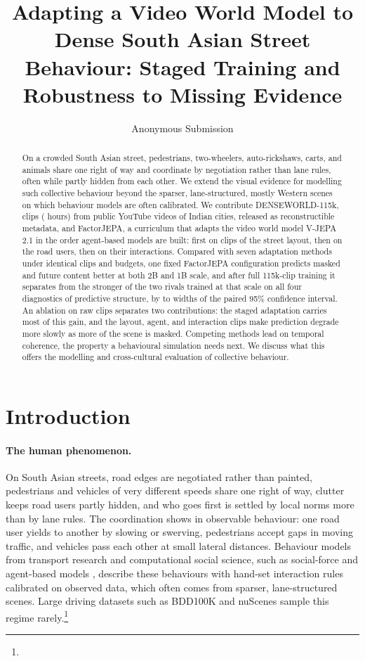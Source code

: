 \documentclass[letterpaper]{article} %
\title{Adapting a Video World Model to Dense South Asian Street Behaviour: Staged Training and Robustness to Missing Evidence}  %
\author{Anonymous Submission}
\begin{document}
\maketitle

\begin{abstract}
On a crowded South Asian street, pedestrians, two-wheelers, auto-rickshaws, carts, and animals share one right of way and coordinate by negotiation rather than lane rules, often while partly hidden from each other. We extend the visual evidence for modelling such collective behaviour beyond the sparser, lane-structured, mostly Western scenes on which behaviour models are often calibrated. We contribute DENSEWORLD-115k, \nClips{} clips (\nHours{} hours) from \nVideos{} public YouTube videos of \nCities{} Indian cities, released as reconstructible metadata, and FactorJEPA, a curriculum that adapts the video world model V-JEPA 2.1 in the order agent-based models are built: first on clips of the street layout, then on the road users, then on their interactions. Compared with seven adaptation methods under identical clips and budgets, one fixed FactorJEPA configuration predicts masked and future content better at both 2B and 1B scale, and after full 115k-clip training it separates from the stronger of the two rivals trained at that scale on all four diagnostics of predictive structure, by \nSepLo{} to \nSepHi{} widths of the paired 95\% confidence interval. An ablation on raw clips separates two contributions: the staged adaptation carries most of this gain, and the layout, agent, and interaction clips make prediction degrade more slowly as more of the scene is masked. Competing methods lead on temporal coherence, the property a behavioural simulation needs next. We discuss what this offers the modelling and cross-cultural evaluation of collective behaviour.
\end{abstract}



\section{Introduction}

\paragraph{The human phenomenon.} On South Asian streets, road edges are negotiated rather than painted, pedestrians and vehicles of very different speeds share one right of way, clutter keeps road users partly hidden, and who goes first is settled by local norms more than by lane rules. The coordination shows in observable behaviour: one road user yields to another by slowing or swerving, pedestrians accept gaps in moving traffic, and vehicles pass each other at small lateral distances. Behaviour models from transport research and computational social science, such as social-force and agent-based models \cite{helbing1995social}, describe these behaviours with hand-set interaction rules calibrated on observed data, which often comes from sparser, lane-structured scenes. Large driving datasets such as BDD100K \cite{yu2020bdd100k} and nuScenes \cite{caesar2020nuscenes} sample this regime rarely.\footnote{\disclosure}
\end{document}
